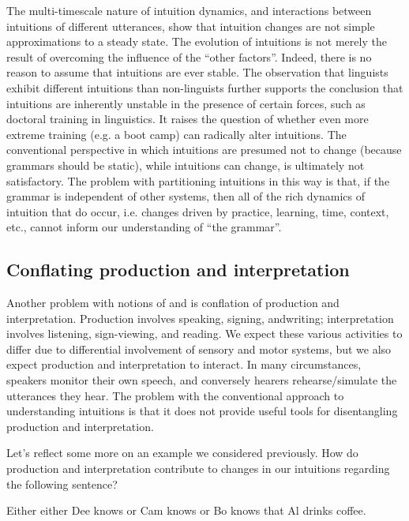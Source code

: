   The multi-timescale nature of intuition dynamics, and interactions between intuitions of different utterances, show that intuition changes are not simple approximations to a steady state. The evolution of intuitions is not merely the result of overcoming the influence of the “other factors”. Indeed, there is no reason to assume that intuitions are ever stable. The observation that linguists exhibit different intuitions than non-linguists \citep{Spencer1973} further supports the conclusion that intuitions are inherently unstable in the presence of certain  forces, such as doctoral training in linguistics. It raises the question of whether even more extreme training (e.g. a  boot camp) can radically alter intuitions. The conventional perspective in which  intuitions are presumed not to change (because grammars should be static), while  intuitions can change, is ultimately not satisfactory. The problem with partitioning intuitions in this way is that, if the grammar is independent of other systems, then all of the rich dynamics of intuition that do occur, i.e. changes driven by practice, learning, time, context, etc., cannot inform our understanding of “the grammar”.

\subsection{Conflating production and interpretation}

Another problem with notions of  and  is conflation of production and interpretation. Production involves speaking, signing, and\linebreak writing; interpretation involves listening, sign-viewing, and reading. We expect these various activities to differ due to differential involvement of sensory and motor systems, but we also expect production and interpretation to interact. In many circumstances, speakers monitor their own speech, and conversely hearers rehearse/simulate the utterances they hear. The problem with the conventional approach to understanding intuitions is that it does not provide useful tools for disentangling production and interpretation.

  Let's reflect some more on an example we considered previously. How do production and interpretation contribute to changes in our intuitions regarding the following sentence? 

\ea
Either either Dee knows or Cam knows or Bo knows that Al drinks coffee.
\z

